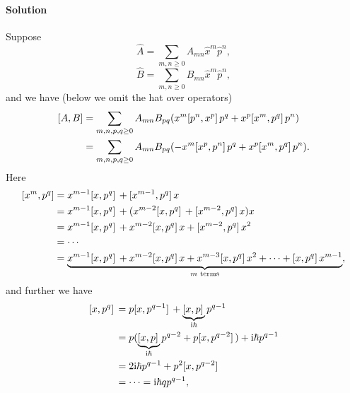 \documentclass[hyperref, a4paper]{article}
\newcommand*{\ii}{\mathrm{i}}
\begin{document}
\paragraph{Solution} Suppose 
\begin{equation}
    \hat{A} = \sum_{m, n \geq 0} A_{mn} \hat{x}^m \hat{p}^n, 
\end{equation}
\begin{equation}
    \hat{B} = \sum_{m, n \geq 0} B_{mn} \hat{x}^m \hat{p}^n,
\end{equation}
and we have (below we omit the hat over operators)
\begin{equation}
    \begin{aligned}
        \comm{A}{B} &= \sum_{m, n, p, q \geq 0} A_{mn} B_{pq} 
        ( x^m \comm*{p^n}{x^p} p^q + 
          x^p \comm*{x^m}{p^q} p^n ) \\
        &=\sum_{m, n, p, q \geq 0} A_{mn} B_{pq} 
        (- x^m \comm*{x^p}{p^n} p^q + 
          x^p \comm*{x^m}{p^q} p^n ).
    \end{aligned}
\end{equation}
Here 
\begin{equation}
    \begin{aligned}
        \comm{x^m}{p^q} &= x^{m-1} \comm*{x}{p^q} + \comm*{x^{m-1}}{p^q} x \\
        &= x^{m-1} \comm*{x}{p^q} + ( x^{m-2} \comm*{x}{p^q} + \comm*{x^{m-2}}{p^q} x ) x \\
        &= x^{m-1} \comm*{x}{p^q} + x^{m-2} \comm*{x}{p^q} x +  \comm*{x^{m-2}}{p^q} x^2 \\
        &= \cdots \\
        &= \underbrace{
            x^{m-1} \comm*{x}{p^q} + x^{m-2} \comm*{x}{p^q} x + x^{m-3} \comm*{x}{p^q} x^2 + \cdots + 
            \comm*{x}{p^q} x^{m-1}
        }_{\text{$m$ terms}},
    \end{aligned}
\end{equation}
and further we have 
\begin{equation}
    \begin{aligned}
        \comm*{x}{p^q} &= p \comm*{x}{p^{q-1}} + \underbrace{\comm*{x}{p}}_{\ii \hbar} p^{q-1} \\
        &= p ( \underbrace{\comm*{x}{p}}_{\ii \hbar} p^{q-2} + p \comm*{x}{p^{q-2}} ) + \ii \hbar p^{q-1} \\
        &= 2 \ii \hbar p^{q-1} + p^2 \comm*{x}{p^{q-2}} \\
        &= \cdots = \ii \hbar q p^{q-1},
    \end{aligned}
\end{equation}
\end{document}
